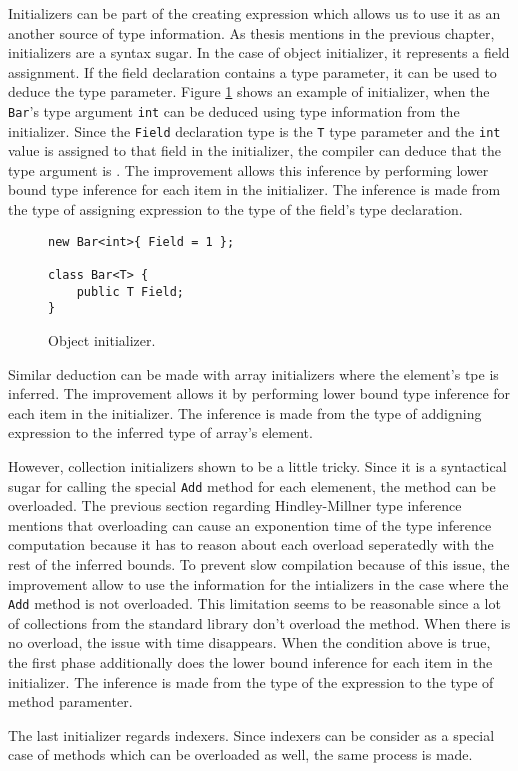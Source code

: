 Initializers can be part of the creating expression which allows us to use it as an another source of type information.
As thesis mentions in the previous chapter, initializers are a syntax sugar.
In the case of object initializer, it represents a field assignment.
If the field declaration contains a type parameter, it can be used to deduce the type parameter.
Figure \ref{img58:initializer} shows an example of initializer, when the \texttt{Bar}'s type argument \texttt{int} can be deduced using type information from the initializer.
Since the \texttt{Field} declaration type is the \texttt{T} type parameter and the \texttt{int} value is assigned to that field in the initializer, the compiler can deduce that the type argument is .
The improvement allows this inference by performing lower bound type inference for each item in the initializer.
The inference is made from the type of assigning expression to the type of the field's type declaration.
\begin{figure}[h!]
\begin{lstlisting}[style=csharp, mathescape=true]
new Bar<int>{ Field = 1 };

class Bar<T> {
    public T Field;
}
\end{lstlisting}
\caption{Object initializer.}
\label{img58:initializer}
\end{figure}
\par
Similar deduction can be made with array initializers where the element's tpe is inferred.
The improvement allows it by performing lower bound type inference for each item in the initializer.
The inference is made from the type of addigning expression to the inferred type of array's element.
\par
However, collection initializers shown to be a little tricky.
Since it is a syntactical sugar for calling the special \texttt{Add} method for each elemenent, the method can be overloaded.
The previous section regarding Hindley-Millner type inference mentions that overloading can cause an exponention time of the type inference computation because it has to reason about each overload seperatedly with the rest of the inferred bounds.
To prevent slow compilation because of this issue, the improvement allow to use the information for the intializers in the case where the \texttt{Add} method is not overloaded.
This limitation seems to be reasonable since a lot of collections from the standard library don't overload the method.
When there is no overload, the issue with time disappears.
When the condition above is true, the first phase additionally does the lower bound inference for each item in the initializer.
The inference is made from the type of the expression to the type of method paramenter.
\par
The last initializer regards indexers.
Since indexers can be consider as a special case of methods which can be overloaded as well, the same process is made.

